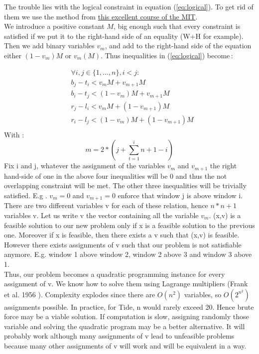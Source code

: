 \documentclass{acmtog}
\begin{document}
The trouble lies with the logical constraint in equation (\ref{eq:logical}). To get rid of them we use the method from \href{https://ocw.mit.edu/courses/sloan-school-of-management/15-053-optimization-methods-in-management-science-spring-2013/lecture-notes/MIT15_053S13_lec11.pdf}{this excellent course of the MIT}.\\ 
We introduce a positive constant $M$, big enough such that every constraint is satisfied if we put it to the right-hand side of an equality (W+H for example). Then we add binary variables $v_m$, and add to the right-hand side of the equation either $(1-v_m) M$ or  $v_m(M)$. Thus inequalities in (\ref{eq:logical}) become\,: 

\begin{equation}
\begin{split}
&\forall i, j \in \{1,..., n\}, i < j : \\
&b_j - t_i < v_mM + v_{m+1}M \\
&b_i - t_j < (1-v_m)M + v_{m+1}M \\
&r_j - l_i < v_mM + (1-v_{m+1})M \\
&r_i - l_j < (1-v_m)M + (1-v_{m+1})M\\
\end{split}
\end{equation}
With :
\begin{equation*}
m = 2 * (j + \sum_{t = 1}^{i}{n+1 -i})
\end{equation*}
Fix i and j, whatever the assignment of the variables $v_m$ and $v_{m+1}$ the right hand-side of one in the above four inequalities will be 0 and thus the not overlapping constraint will be met. The other three inequalities will be trivially satisfied. E.g  . $v_m = 0$ and $v_{m+1} = 0$ enforce that window j is above window i. There are two different variables v for each of these relation, hence $n*n+1$ variables v. Let us write v the vector containing all the variable $v_m$. (x,v) is a feasible solution to our new problem only if x is a feasible solution to the previous one. Moreover if x is feasible, then there exists a v such that (x,v) is feasible.\\
However there exists assignments of v such that our problem is not satisfiable anymore. E.g. window 1 above window 2, window 2 above 3 and window 3 above 1.\\
Thus, our problem becomes a quadratic programming instance for every assignment of v. We know how to solve them using Lagrange multipliers (Frank et al. 1956 \cite{Frank56}).
Complexity explodes since there are $O(n^2)$ variables, so $O(2^{n^2})$ assignments possible. In practice, for Tide, n would rarely exceed 20. Hence brute force may be a viable solution. If computation is slow, assigning randomly those variable and solving the quadratic program may be a better alternative. It will probably work although many assignments of v lead to unfeasible problems because many other assignments of v will work and will be equivalent in a way. \\
\end{document}
